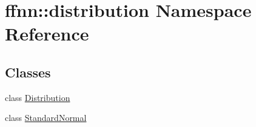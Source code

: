\hypertarget{namespaceffnn_1_1distribution}{\section{ffnn\-:\-:distribution Namespace Reference}
\label{namespaceffnn_1_1distribution}
}
\subsection*{Classes}
\begin{DoxyCompactItemize}
\item 
class \hyperlink{classffnn_1_1distribution_1_1_distribution}{Distribution}
\item 
class \hyperlink{classffnn_1_1distribution_1_1_standard_normal}{Standard\-Normal}
\end{DoxyCompactItemize}
